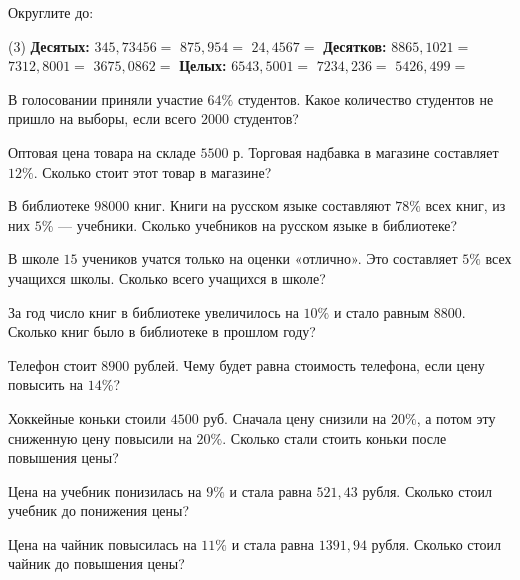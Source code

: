\begin{class}[number=2]
	\begin{listofex}
		\item Округлите до:
		\begin{tasks}(3)
			\task[] \textbf{Десятых:}
			\task[]
			\task[]
			\task \( 345,73456 = \)
			\task \( 875, 954 = \)
			\task \( 24,4567 = \)
			\task[] \textbf{Десятков:}
			\task[]
			\task[]
			\task \( 8865,1021 = \)
			\task \( 7312,8001 = \)
			\task \( 3675,0862 = \)
			\task[] \textbf{Целых:}
			\task[]
			\task[]
			\task \( 6543,5001 = \)
			\task \( 7234,236 = \)
			\task \( 5426,499 = \)
		\end{tasks}
		\item  В голосовании приняли участие \( 64\% \) студентов. Какое количество студентов не пришло на выборы, если всего \( 2000 \) студентов? 
		\item Оптовая цена товара на складе \( 5500 \) р. Торговая надбавка в магазине составляет \( 12\% \). 
		Сколько стоит этот товар в магазине?  
		\item В библиотеке \( 98000  \) книг. Книги на русском языке составляют \( 78\% \) всех книг, из
		них \( 5\% \) --- учебники. Сколько учебников на русском языке в библиотеке?
		\item В школе \( 15 \) учеников учатся только на оценки «отлично». Это составляет \( 5\% \) всех учащихся
		школы. Сколько всего учащихся в школе? 
		\item За год число книг в библиотеке увеличилось на \( 10\% \) и стало равным \( 8800 \). Сколько книг
		было в библиотеке в прошлом году?
		\item Телефон стоит \( 8900 \) рублей. Чему будет равна стоимость телефона, если цену повысить на \( 14\% \)?
		\item Хоккейные коньки стоили \( 4500 \) руб. Сначала цену снизили на \( 20\% \), а потом эту сниженную цену повысили на \( 20\% \). Сколько стали стоить коньки после повышения цены?
		\item Цена на учебник понизилась на \( 9\% \) и стала равна \( 521,43  \) рубля. Сколько стоил учебник до понижения цены?
		\item Цена на чайник повысилась на \( 11\% \) и стала равна \( 1391,94  \) рубля. Сколько стоил чайник до повышения цены?
	\end{listofex}
\end{class}

